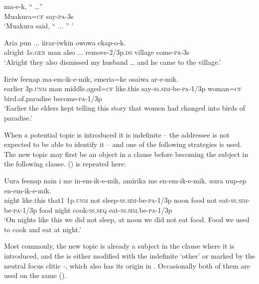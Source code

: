 \ea%
\label{ex:x1664}
\gll {}  ma-e-k,  ``  {\dots''} \\
Muakura=\textsc{cf}  say-\textsc{pa}-3s      \\
\glt`Muakura said, `` ... '' '
\z


\ea%
\label{ex:x1665}
\gll Aria    pun  ...  iirar-iwkin  owowa  ekap-o-k. \\
alright  1s.\textsc{gen}  man  also  ...  remove-2/3p.\textsc{ds}  village  come-\textsc{pa}-3s      \\
\glt`Alright they also dismissed my husband {\dots} and he came to the village.'
\z


\ea%
\label{ex:x1667}
\gll Iiriw      feenap ma-em-ik-e-mik,  emeria=ke  osaiwa  ar-e-mik. \\
earlier  3p.\textsc{unm}  man  middle.aged=\textsc{cf}  like.this say-\textsc{ss}.\textsc{sim}-be-\textsc{pa}-1/3p  woman=\textsc{cf}  bird.of.paradise  become-\textsc{pa}-1/3p    \\
\glt`Earlier the elders kept telling this story that women had changed into birds of paradise.'
\z


When a potential topic is introduced it is indefinite -- the addressee is not expected to be able to identify it -- and one of the following strategies is used. The new topic may  first be an object in a clause before becoming the subject in the following clause. () is repeated here: 

\ea%
\label{ex:x1668}
\gll Uura  feenap  nain  i  me  in-em-ik-e-mik, amirika    me  en-em-ik-e-mik.   uura  uup-ep  en-em-ik-e-mik.\\
night  like.this  that1  1p.\textsc{unm}  not  sleep-\textsc{ss}.\textsc{sim}-be-\textsc{pa}-1/3p noon  food  not  eat-\textsc{ss}.\textsc{sim}-be-\textsc{pa}-1/3p food  night  cook-\textsc{ss}.\textsc{seq}  eat-\textsc{ss}.\textsc{sim}.be-\textsc{pa}-1/3p    \\
\glt`On nights like this we did not sleep, at noon we did not eat food. Food we used to cook and eat at night.'
\z


Most commonly, the new topic is already a subject in the clause where it is introduced, and the  is either modified with the indefinite  `other' or marked by the neutral focus clitic \textit{-}, which also has its origin in . Occasionally both of them are used on the same  (). 

